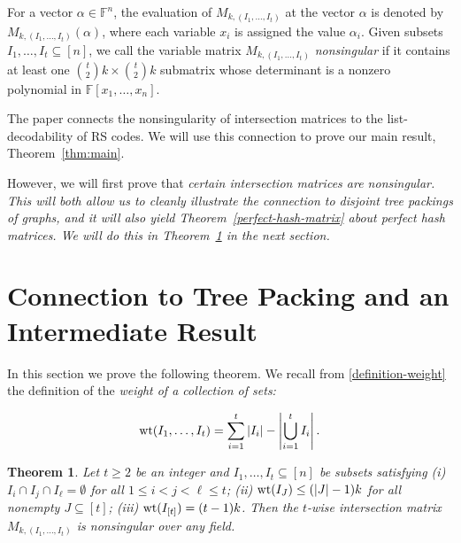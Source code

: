 \documentclass[11pt]{article}
\newtheorem{theorem}{Theorem}[section]
\newtheorem{claim}[theorem]{Claim}
\newcommand\black[1]{{\color{black} #1}}
\newcommand{\s}{\subseteq}
\newcommand{\wt}{{\rm wt}}
\begin{document}
For a vector $\alpha\in\mathbb{F}^n$, the evaluation of $M_{k,(I_1,\ldots,I_t)}$ at the vector $\alpha$ is denoted by $M_{k,(I_1,\ldots,I_t)}(\alpha)$, where each variable $x_i$ is assigned the value $\alpha_i$. Given subsets $I_1,\ldots,I_t\subseteq[n]$, we call the variable matrix $M_{k,(I_1,\ldots,I_t)}$ {\it nonsingular} if it contains at least one $\binom{t}{2}k\times\binom{t}{2}k$ submatrix whose determinant is a nonzero polynomial in $\mathbb{F}[x_1,\ldots,x_n]$.


The paper \cite{shangguan2019combinatorial0} connects the nonsingularity of intersection matrices to the list-decodability of RS codes.
We will use this connection to prove our main result, Theorem~\ref{thm:main}.

However, we will first prove that \em certain \em intersection matrices are nonsingular.  This will both allow us to cleanly illustrate the connection to disjoint tree packings of graphs, and it will also yield Theorem~\ref{perfect-hash-matrix} about perfect hash matrices.  We will do this in Theorem~\ref{theorem-weaker} in the next section.

\section{Connection to Tree Packing and an Intermediate Result}
\label{sec:3}

In this section we prove the following theorem.  We recall from \eqref{definition-weight} the definition of the \em weight \em of a collection of sets:

\begin{equation}
  {\rm wt}(I_1,\ldots,I_t)=\sum_{i=1}^t |I_i|-\left|\bigcup_{i=1}^t I_i\right|.
\end{equation}

\begin{theorem}\label{theorem-weaker}
  Let $t\ge 2$ be an integer and $I_1,\ldots,I_t\s[n]$ be subsets satisfying \rm{(i)} $I_i\cap I_j\cap I_{\ell}=\emptyset$ for all $1\le i<j<\ell\le t$; \rm{(ii)} $\wt(I_J)\leq (|J|-1)k$ for all  nonempty $J\subseteq [t]$; \rm{(iii)}  $\wt(I_{[t]})=(t-1)k$. Then the $t$-wise intersection matrix $M_{k,(I_1,\ldots,I_t)}$ is nonsingular over any field.
\end{theorem}
\end{document}
